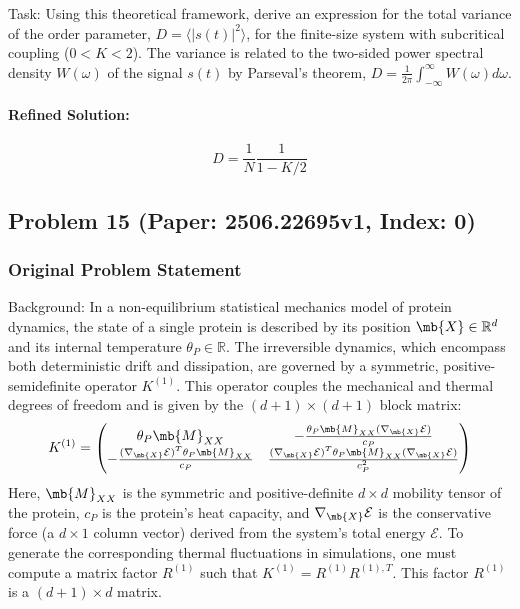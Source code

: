 \documentclass[10pt]{article}
\begin{document}
Task:
Using this theoretical framework, derive an expression for the total variance of the order parameter, $D = \langle |s(t)|^2 \rangle$, for the finite-size system with subcritical coupling ($0 < K < 2$). The variance is related to the two-sided power spectral density $W(\omega)$ of the signal $s(t)$ by Parseval's theorem, $D = \frac{1}{2\pi} \int_{-\infty}^{\infty} W(\omega) d\omega$.

\paragraph*{Refined Solution:}
\[ D=\frac{1}{N}\frac{1}{1-K/2} \]

\newpage
\subsection*{Problem 15 (Paper: 2506.22695v1, Index: 0)}

\subsubsection*{Original Problem Statement}
Background:
In a non-equilibrium statistical mechanics model of protein dynamics, the state of a single protein is described by its position $\mb{X} \in \mathbb{R}^d$ and its internal temperature $\theta_P \in \mathbb{R}$. The irreversible dynamics, which encompass both deterministic drift and dissipation, are governed by a symmetric, positive-semidefinite operator $K^{(1)}$. This operator couples the mechanical and thermal degrees of freedom and is given by the $(d+1) \times (d+1)$ block matrix:
\begin{equation*}
K^{(1)} = 
\begin{pmatrix}
\theta_P \mb{M}_{\tiny XX} & -\frac{\theta_P \mb{M}_{\tiny XX}(\nabla_{\mb{X}} \mathcal{E})}{c_P} \\
-\frac{(\nabla_{\mb{X}} \mathcal{E})^{T}\theta_P \mb{M}_{\tiny XX}}{c_P} & \frac{(\nabla_{\mb{X}} \mathcal{E})^{T}\theta_P \mb{M}_{\tiny XX}(\nabla_{\mb{X}} \mathcal{E})}{c_P^2}
\end{pmatrix}
\end{equation*}
Here, $\mb{M}_{\tiny XX}$ is the symmetric and positive-definite $d \times d$ mobility tensor of the protein, $c_P$ is the protein's heat capacity, and $\nabla_{\mb{X}} \mathcal{E}$ is the conservative force (a $d \times 1$ column vector) derived from the system's total energy $\mathcal{E}$. To generate the corresponding thermal fluctuations in simulations, one must compute a matrix factor $R^{(1)}$ such that $K^{(1)} = R^{(1)}R^{(1),T}$. This factor $R^{(1)}$ is a $(d+1) \times d$ matrix.
\end{document}
